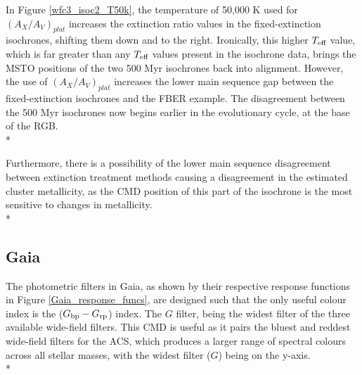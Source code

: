 \documentclass[12pt, a4paper]{report}
\begin{document}
In Figure \ref{wfc3_isoc2_T50k}, the temperature of 50,000 K used for $(A_{X}/A_{V})_{plat}$ increases the extinction ratio values in the fixed-extinction isochrones, shifting them down and to the right. Ironically, this higher $T_{\textnormal{eff}}$ value, which is far greater than any $T_{\textnormal{eff}}$ values present in the isochrone data, brings the MSTO positions of the two 500 Myr isochrones back into alignment. However, the use of $(A_{X}/A_{V})_{plat}$ increases the lower main sequence gap between the fixed-extinction isochrones and the FBER example. The disagreement between the 500 Myr isochrones now begins earlier in the evolutionary cycle, at the base of the RGB. \\*

Furthermore, there is a possibility of the lower main sequence disagreement between extinction treatment methods causing a disagreement in the estimated cluster metallicity, as the CMD position of this part of the isochrone is the most sensitive to changes in metallicity. \\*

\subsection{Gaia} \label{Gaia_isoc}

The photometric filters in Gaia, as shown by their respective response functions in Figure \ref{Gaia_response_funcs}, are designed such that the only useful colour index is the ($G_{\textnormal{bp}}-G_{\textnormal{rp}}$) index. The $G$ filter, being the widest filter of the three available wide-field filters. This CMD is useful as it pairs the bluest and reddest wide-field filters for the ACS, which produces a larger range of spectral colours across all stellar masses, with the widest filter ($G$) being on the y-axis.\\*
\end{document}
